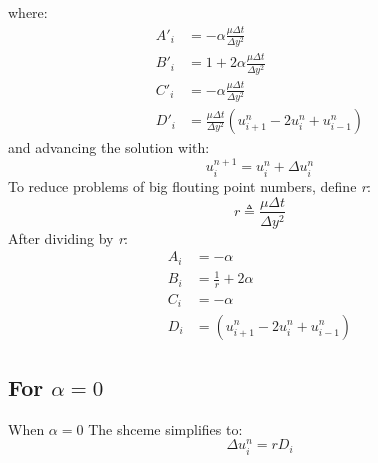 \documentclass[11pt, a4paper]{article}
\begin{document}
where:
\begin{align}
    A'_i &= - \alpha\frac{\mu\Delta t}{\Delta y^2}\\
    B'_i &= 1 + 2 \alpha\frac{\mu\Delta t}{\Delta y^2}\\
    C'_i &= - \alpha\frac{\mu\Delta t}{\Delta y^2}\\
    D'_i &= \frac{\mu\Delta t}{\Delta y^2}\left(u^n_{i+1} - 2u^n_{i} + u^n_{i-1}\right)
\end{align}
and advancing the solution with:
\begin{equation}
    u^{n+1}_i = u^n_i + \Delta u^n_i
\end{equation}
To reduce problems of big flouting point numbers, define \emph{r}:
\begin{equation}
    r \triangleq \frac{\mu\Delta t}{\Delta y^2}
\end{equation}
After dividing by \emph{r}:
\begin{align}
    A_i &= - \alpha\\
    B_i &= \frac{1}{r} + 2 \alpha\\
    C_i &= - \alpha\\
    D_i &= \left(u^n_{i+1} - 2u^n_{i} + u^n_{i-1}\right)
\end{align}
\subsection{For $\alpha = 0$}
When $\alpha = 0$ The shceme simplifies to:
\begin{equation}
    \Delta u^n_i = rD_i
\end{equation}
\end{document}
